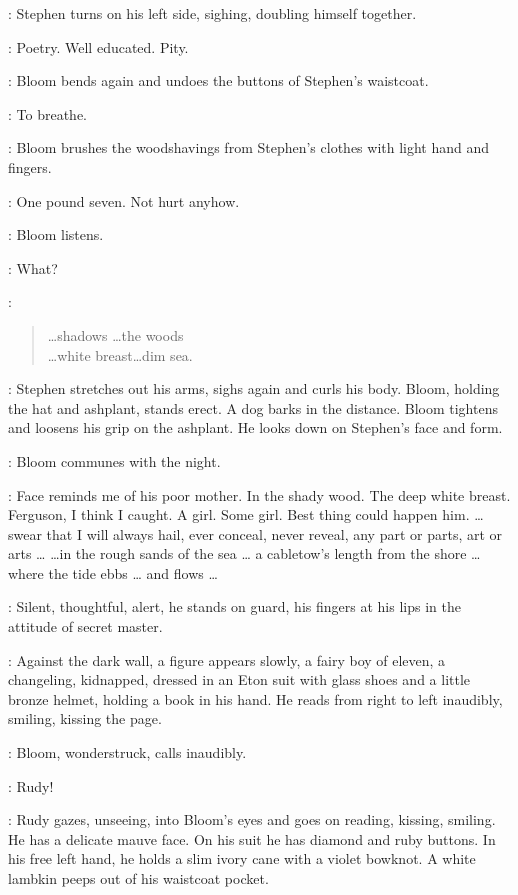 :
Stephen turns on his left side, sighing, doubling himself together.

\Bloom:
Poetry.
Well educated.
Pity.

:
Bloom bends again and undoes the buttons of Stephen's waistcoat.

\Bloom:
To breathe.

:
Bloom brushes the woodshavings from Stephen's clothes with light hand and fingers.

\Bloom:
One pound seven.
Not hurt anyhow.

:
Bloom listens.

\Bloom:
What?

\Stephen:
\begin{verse}
    \ldots shadows \ldots the woods\\
    \ldots white breast\ldots dim sea.
\end{verse}

:
Stephen stretches out his arms, sighs again and curls his body.
Bloom, holding the hat and ashplant, stands erect.
A dog barks in the distance.
Bloom tightens and loosens his grip on the ashplant.
He looks down on Stephen's face and form.

:
Bloom communes with the night.

\Bloom:
Face reminds me of his poor mother.
In the shady wood.
The deep white breast.
Ferguson, I think I caught.
A girl.
Some girl.
Best thing could happen him.
\ldots swear that I will always hail, ever conceal, never reveal,
any part or parts, art or arts \ldots
{}
\ldots in the rough sands of the sea \ldots
a cabletow's length from the shore \ldots
where the tide ebbs \ldots
and flows \ldots

:
Silent, thoughtful, alert, he stands on guard,
his fingers at his lips in the attitude of secret master.

:
Against the dark wall, a figure appears slowly,
a fairy boy of eleven, a changeling, kidnapped,
dressed in an Eton suit with glass shoes and a little bronze helmet,
holding a book in his hand.
He reads from right to left inaudibly, smiling, kissing the page.%

:
Bloom, wonderstruck, calls inaudibly.

\Bloom:
Rudy!

:
Rudy gazes, unseeing, into Bloom's eyes and goes on reading, kissing, smiling.
He has a delicate mauve face.
On his suit he has diamond and ruby buttons.
In his free left hand, he holds a slim ivory cane with a violet bowknot.
A white lambkin peeps out of his waistcoat pocket.
